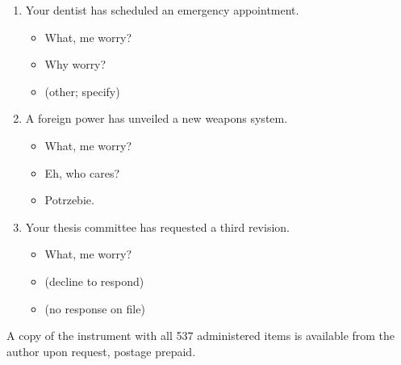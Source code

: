 \documentclass{cpthesis}
\begin{document}
\begin{appendices}
\begin{enumerate}
    \item Your dentist has scheduled an emergency appointment.
        \begin{itemize}
            \item[$\square$] What, me worry?
            \item[$\square$] Why worry?
            \item[$\square$] (other; specify)
        \end{itemize}
    \item A foreign power has unveiled a new weapons system.
        \begin{itemize}
            \item[$\square$] What, me worry?
            \item[$\square$] Eh, who cares?
            \item[$\square$] Potrzebie.
        \end{itemize}
    \item Your thesis committee has requested a third revision.
        \begin{itemize}
            \item[$\square$] What, me worry?
            \item[$\square$] (decline to respond)
            \item[$\square$] (no response on file)
        \end{itemize}
\end{enumerate}

A copy of the instrument with all 537 administered items is available
from the author upon request, postage prepaid.

\end{appendices}
\end{document}
